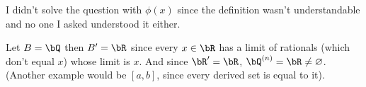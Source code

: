 \documentclass[10pt]{article}
\makeatletter
\def\@blist[#1]{%
    \bgroup\bgroup\par\vskip-\medskipamount%
    \gdef\item{%
        \par\egroup\bgroup\medskip\setbox0=\hbox{#1\quad}%
        \advance\leftskip by \wd0\leavevmode\kern-\wd0\box0%
    }%
}
\def\blist{\@ifnextchar[ \@blist {\@blist[$\bullet$]}}
\def\elist{\par\egroup\egroup\medskip}
\makeatother
\begin{document}
I didn't solve the question with $\phi(x)$ since the definition wasn't understandable and no one I asked understood it either.

\begin{blankpp}

    Let $B=\bQ$ then $B'=\bR$ since every $x\in\bR$ has a limit of rationals (which don't equal $x$) whose limit is $x$.
    And since $\bR'=\bR$, $\bQ^{(n)}=\bR\neq\varnothing$.
    (Another example would be $[a,b]$, since every derived set is equal to it).


\end{blankpp}

\end{document}
